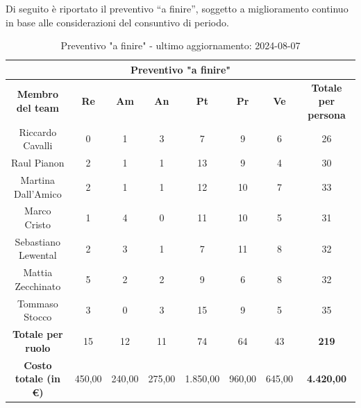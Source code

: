 \begin{minipage}{\textwidth}
Di seguito è riportato il preventivo “a finire”, soggetto a miglioramento continuo in base alle considerazioni del consuntivo di periodo.
\begin{table}[H]
  \centering
  \begin{adjustbox}{max width=\textwidth}
  \begin{tabular}{|c|c|c|c|c|c|c|c|}
    \hline
    \multicolumn{8}{|c|}{\textbf{Preventivo "a finire"}} \\
    \hline
    \textbf{Membro del team} & \textbf{Re} & \textbf{Am} & \textbf{An} & \textbf{Pt} & \textbf{Pr} & \textbf{Ve} & \textbf{Totale per persona} \\
    \hline
    Riccardo Cavalli & 0 & 1 & 3 & 7 & 9 & 6 & 26 \\
    \hline
    Raul Pianon & 2 & 1 & 1 & 13 & 9 & 4 & 30 \\
    \hline
    Martina Dall'Amico & 2 & 1 & 1 & 12 & 10 & 7 & 33 \\
    \hline
    Marco Cristo & 1 & 4 & 0 & 11 & 10 & 5 & 31 \\
    \hline
    Sebastiano Lewental & 2 & 3 & 1 & 7 & 11 & 8 & 32 \\
    \hline
    Mattia Zecchinato & 5 & 2 & 2 & 9 & 6 & 8 & 32 \\
    \hline
    Tommaso Stocco & 3 & 0 & 3 & 15 & 9 & 5 & 35 \\
    \hline
    \textbf{Totale per ruolo} & 15 & 12 & 11 & 74 & 64 & 43 & \textbf{219} \\
    \hline
    \textbf{Costo totale (in €)} & 450,00 & 240,00 & 275,00 & 1.850,00 & 960,00 & 645,00 & \textbf{4.420,00} \\
    \hline
  \end{tabular}
  \end{adjustbox}
  \caption{Preventivo "a finire" - ultimo aggiornamento: 2024-08-07}\label{tab:preventivo-a-finire}
\end{table}
\end{minipage}
